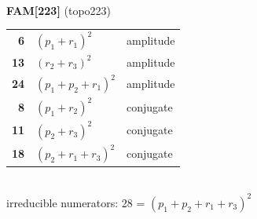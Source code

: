 \documentclass[10pt]{article}
\begin{document}
\begin{minipage}[t]{0.48\textwidth}
{}\\[2mm]\textbf{FAM[223]} (topo223)\\[2pt]{\footnotesize\begin{tabular}{@{}r@{\ \ }l@{\ \ }l@{}}\textbf{6} & $(p_1+r_1)^2$ & amplitude\\
\textbf{13} & $(r_2+r_3)^2$ & amplitude\\
\textbf{24} & $(p_1+p_2+r_1)^2$ & amplitude\\
\textbf{8} & $(p_1+r_2)^2$ & conjugate\\
\textbf{11} & $(p_2+r_3)^2$ & conjugate\\
\textbf{18} & $(p_2+r_1+r_3)^2$ & conjugate\\\end{tabular}}\\[2pt]{\scriptsize irreducible numerators: 28 = $(p_1+p_2+r_1+r_3)^2$}\end{minipage}

\bigskip
\end{document}
